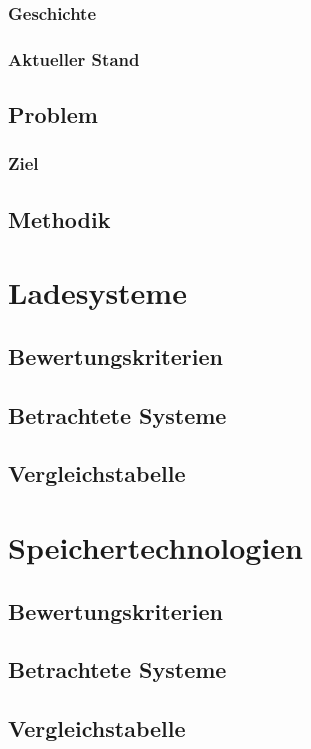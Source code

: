 \documentclass[twoside]{scrreprt}
\begin{document}
\subsection{Geschichte}
\subsection{Aktueller Stand}
\section{Problem}
\subsection{Ziel} %
\section{Methodik} %

\chapter{Ladesysteme} %
\section{Bewertungskriterien} %
\section{Betrachtete Systeme} %
\section{Vergleichstabelle}

\chapter{Speichertechnologien} %
\cite{Lajunen20141}
\section{Bewertungskriterien} %
\section{Betrachtete Systeme} %
\section{Vergleichstabelle}   %
\end{document}
